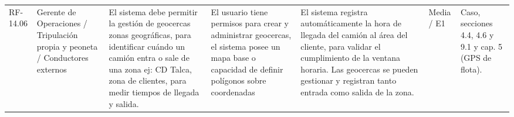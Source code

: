 {\begin{longtable}{@{}F{0.062} F{0.080} F{0.195} F{0.160} F{0.240} F{0.093} F{0.170}@{}}
  RF-14.06 & Gerente de Operaciones / Tripulación propia y peoneta / Conductores externos & El sistema debe permitir la gestión de geocercas zonas geográficas, para identificar cuándo un camión entra o sale de una zona ej: CD Talca, zona de clientes, para medir tiempos de llegada y salida. & El usuario tiene permisos para crear y administrar geocercas, el sistema posee un mapa base o capacidad de definir polígonos sobre coordenadas & El sistema registra automáticamente la hora de llegada del camión al área del cliente, para validar el cumplimiento de la ventana horaria. Las geocercas se pueden gestionar y registran tanto entrada como salida de la zona. & Media / E1 & Caso, secciones 4.4, 4.6 y 9.1 y cap. 5 (GPS de flota). \\
\end{longtable}}
